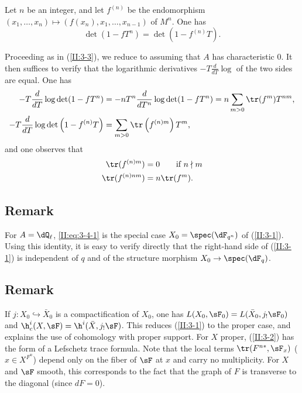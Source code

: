 \begin{corollary_}\label{II:3-4}
Let $n$ be an integer, and let $f^{(n)}$ be the endomorphism
$(x_1,\dotsc,x_n)\mapsto \left(f(x_n),x_1,\dotsc,x_{n-1}\right)$ of $M^n$.
One has
\begin{equation*}\tag{3.4.1}\label{II:eq:3-4-1}
  \det(1-f T^n) = \det(1-f^{(n)} T) \text{.}
\end{equation*}
\end{corollary_}

Proceeding as in (\ref{II:3-3}), we reduce to assuming that $A$ has
characteristic $0$. It then suffices to verify that the logarithmic
derivatives $-T\frac{d}{dT}\log$ of the two sides are equal. One has
\begin{align*}
  -T\frac{d}{dT}\log\det(1-f T^n) &= - n T^n \frac{d}{dT^n} \log\det(1-f T^n) = n \sum_{m>0} \tr(f^m) T^{n m} \text{,} \\
  -T \frac{d}{dT}\log\det\left(1-f^{(n)} T\right) &= \sum_{m>0} \tr\left(f^{(n) m}\right) T^m \text{,}
\end{align*}
and one observes that
\begin{align*}
  \tr(f^{(n) m}) &= 0 \qquad \text{if $n\nmid m$} \\
  \tr(f^{(n) n m}) &= n \tr(f^m) \text{.}
\end{align*}






\subsection{Remark}\label{II:3-5}

For $A=\dQ_\ell$, \eqref{II:eq:3-4-1} is the special case
$X_0=\spec(\dF_{q^n})$ of (\ref{II:3-1}). Using this identity, it is easy to
verify directly that the right-hand side of (\ref{II:3-1}) is independent of
$q$ and of the structure morphism $X_0\to\spec(\dF_q)$.






\subsection{Remark}\label{II:3-6}

If $j:X_0\hookrightarrow \bar X_0$ is a compactification of $X_0$, one has
$L(X_0,\sF_0) = L(\bar X_0, j_!\sF_0)$ and
$\h_c^i(X,\sF) = \h^i(\bar X,j_!\sF)$. This reduces (\ref{II:3-1}) to the
proper case, and explains the use of cohomology with proper support. For $X$
proper, (\ref{II:3-2}) has the form of a Lefschetz trace formula. Note that
the local terms $\tr(F^{n *},\sF_x)$ ($x\in X^{F^n}$) depend only on the
fiber of $\sF$ at $x$ and carry no multiplicity. For $X$ and $\sF$ smooth,
this corresponds to the fact that the graph of $F$ is transverse to the
diagonal (since $d F = 0$).






